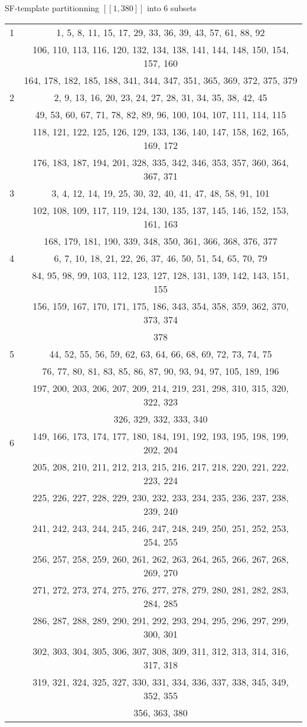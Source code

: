 \documentclass{article}
\newtheorem{computational theorem}{Computational Theorem}[section]
\begin{document}
\begin{center}
SF-template partitionning \([\![1, 380]\!]\) into 6 subsets
\begin{tabular}{|*{2}{c|}}
	\hline
	1 & 1, 5, 8, 11, 15, 17, 29, 33, 36, 39, 43, 57, 61, 88, 92 \\
	& 106, 110, 113, 116, 120, 132, 134, 138, 141, 144, 148, 150, 154, 157, 160 \\
	& 164, 178, 182, 185, 188, 341, 344, 347, 351, 365, 369, 372, 375, 379\\
	\hline
	2 & 2, 9, 13, 16, 20, 23, 24, 27, 28, 31, 34, 35, 38, 42, 45\\
	& 49, 53, 60, 67, 71, 78, 82, 89, 96, 100, 104, 107, 111, 114, 115\\
	& 118, 121, 122, 125, 126, 129, 133, 136, 140, 147, 158, 162, 165, 169, 172\\
	& 176, 183, 187, 194, 201, 328, 335, 342, 346, 353, 357, 360, 364, 367, 371\\
	\hline
	3 & 3, 4, 12, 14, 19, 25, 30, 32, 40, 41, 47, 48, 58, 91, 101\\
	& 102, 108, 109, 117, 119, 124, 130, 135, 137, 145, 146, 152, 153, 161, 163\\
	& 168, 179, 181, 190, 339, 348, 350, 361, 366, 368, 376, 377\\
	\hline
	4 & 6, 7, 10, 18, 21, 22, 26, 37, 46, 50, 51, 54, 65, 70, 79\\
	& 84, 95, 98, 99, 103, 112, 123, 127, 128, 131, 139, 142, 143, 151, 155\\
	& 156, 159, 167, 170, 171, 175, 186, 343, 354, 358, 359, 362, 370, 373, 374\\
	& 378\\
	\hline
	5 & 44, 52, 55, 56, 59, 62, 63, 64, 66, 68, 69, 72, 73, 74, 75\\
	& 76, 77, 80, 81, 83, 85, 86, 87, 90, 93, 94, 97, 105, 189, 196\\
	& 197, 200, 203, 206, 207, 209, 214, 219, 231, 298, 310, 315, 320, 322, 323\\
	& 326, 329, 332, 333, 340\\
	\hline
	6 & 149, 166, 173, 174, 177, 180, 184, 191, 192, 193, 195, 198, 199, 202, 204\\
	& 205, 208, 210, 211, 212, 213, 215, 216, 217, 218, 220, 221, 222, 223, 224\\
	& 225, 226, 227, 228, 229, 230, 232, 233, 234, 235, 236, 237, 238, 239, 240\\
	& 241, 242, 243, 244, 245, 246, 247, 248, 249, 250, 251, 252, 253, 254, 255\\
	& 256, 257, 258, 259, 260, 261, 262, 263, 264, 265, 266, 267, 268, 269, 270\\
	& 271, 272, 273, 274, 275, 276, 277, 278, 279, 280, 281, 282, 283, 284, 285\\
	& 286, 287, 288, 289, 290, 291, 292, 293, 294, 295, 296, 297, 299, 300, 301\\
	& 302, 303, 304, 305, 306, 307, 308, 309, 311, 312, 313, 314, 316, 317, 318\\
	& 319, 321, 324, 325, 327, 330, 331, 334, 336, 337, 338, 345, 349, 352, 355\\
	& 356, 363, 380\\
	\hline


\end{tabular}
\end{center}
\end{document}
